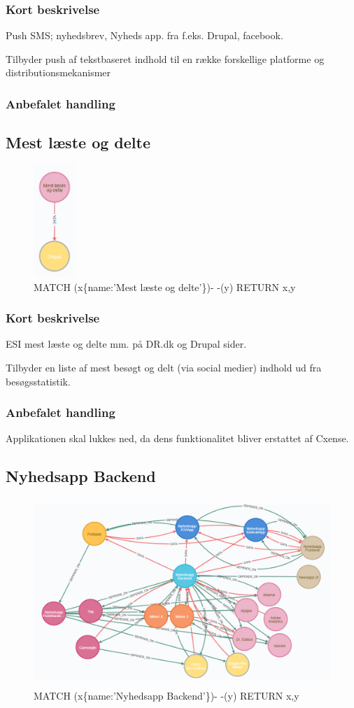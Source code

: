 \documentclass{article}
\begin{document}
\subsubsection*{Kort beskrivelse}
Push SMS; nyhedsbrev, Nyheds app. fra f.eks. Drupal, facebook.

Tilbyder push af tekstbaseret indhold til en række forskellige platforme og distributionsmekanismer
\subsubsection*{Anbefalet handling}



\subsection{Mest læste og delte}
\begin{figure}[h]
\includegraphics[height=120pt]{MestL.PNG}
\caption{MATCH (x\{name:'Mest læste og delte'\})- -(y) RETURN x,y}
\end{figure}
\subsubsection*{Kort beskrivelse}
ESI mest læste og delte mm. på DR.dk og Drupal sider.

Tilbyder en liste af mest besøgt og delt (via social medier) indhold ud fra besøgsstatistik.
\subsubsection*{Anbefalet handling}
Applikationen skal lukkes ned, da dens funktionalitet bliver erstattet af Cxense.



\subsection{Nyhedsapp Backend}
\begin{figure}[h]
\includegraphics[height=200pt]{NyhedsappBE.PNG}
\caption{MATCH (x\{name:'Nyhedsapp Backend'\})- -(y) RETURN x,y}
\end{figure}
\end{document}
